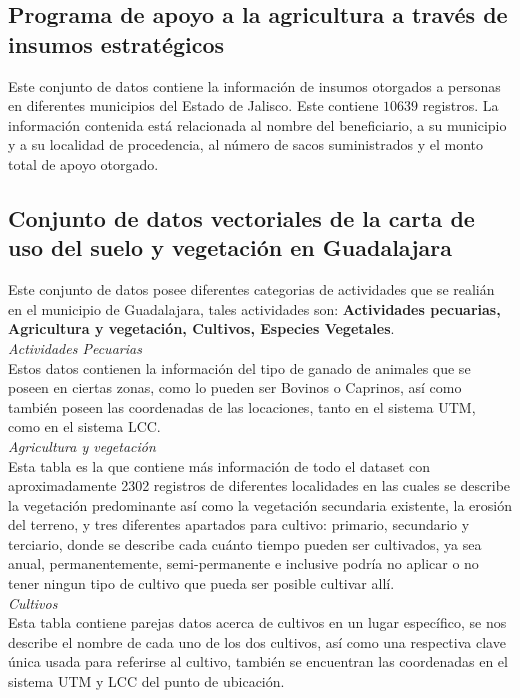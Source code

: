 \documentclass[10pt,letterpaper]{article}
\begin{document}
\subsection{Programa de apoyo a la agricultura a trav\'es de insumos estrat\'egicos}

Este conjunto de datos contiene la informaci\'on de insumos otorgados a personas en diferentes municipios del Estado de Jalisco.
Este contiene $10639$ registros.
La informaci\'on contenida est\'a relacionada al nombre del beneficiario, a su municipio y a su localidad de procedencia, al n\'umero de sacos suministrados y el monto total de apoyo otorgado.

\subsection{Conjunto de datos vectoriales de la carta de uso del suelo y vegetaci\'on en Guadalajara}

Este conjunto de datos posee diferentes categorias de actividades que se reali\'an en el municipio de Guadalajara, tales actividades son: \textbf{Actividades pecuarias, Agricultura y vegetaci\'on, Cultivos, Especies Vegetales}.\\

\textit{Actividades Pecuarias} \\
Estos datos contienen la informaci\'on del tipo de ganado de animales que se poseen en ciertas zonas, como lo pueden ser Bovinos o Caprinos, as\'i como tambi\'en poseen las coordenadas de las locaciones, tanto en el sistema UTM, como en el sistema LCC. \\

\textit{Agricultura y vegetaci\'on}\\
Esta tabla es la que contiene m\'as informaci\'on de todo el dataset con aproximadamente 2302 registros de diferentes localidades en las cuales se describe la vegetaci\'on predominante as\'i como la vegetaci\'on secundaria existente, la erosi\'on del terreno, y tres diferentes apartados para cultivo: primario, secundario y terciario, donde se describe cada cu\'anto tiempo pueden ser cultivados, ya sea anual, permanentemente, semi-permanente e inclusive podr\'ia no aplicar o no tener ningun tipo de cultivo que pueda ser posible cultivar all\'i.\\

\textit{Cultivos}\\
Esta tabla contiene parejas datos acerca de cultivos en un lugar espec\'ifico, se nos describe el nombre de cada uno de los dos cultivos, as\'i como una respectiva clave \'unica usada para referirse al cultivo, tambi\'en se encuentran las coordenadas en el sistema UTM y LCC del punto de ubicaci\'on.
\end{document}
